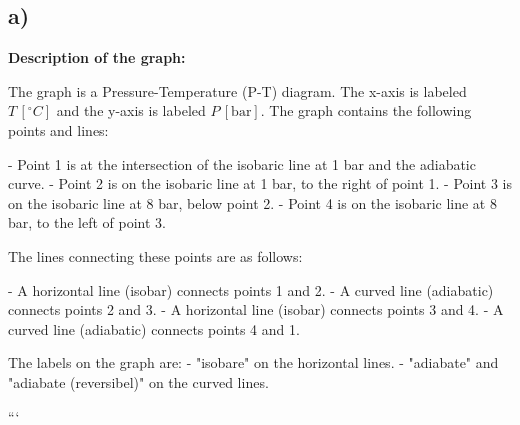 

\subsection*{a)}

\textbf{Description of the graph:}

The graph is a Pressure-Temperature (P-T) diagram. The x-axis is labeled \( T \, [^\circ C] \) and the y-axis is labeled \( P \, [\text{bar}] \). The graph contains the following points and lines:

- Point 1 is at the intersection of the isobaric line at 1 bar and the adiabatic curve.
- Point 2 is on the isobaric line at 1 bar, to the right of point 1.
- Point 3 is on the isobaric line at 8 bar, below point 2.
- Point 4 is on the isobaric line at 8 bar, to the left of point 3.

The lines connecting these points are as follows:

- A horizontal line (isobar) connects points 1 and 2.
- A curved line (adiabatic) connects points 2 and 3.
- A horizontal line (isobar) connects points 3 and 4.
- A curved line (adiabatic) connects points 4 and 1.

The labels on the graph are:
- "isobare" on the horizontal lines.
- "adiabate" and "adiabate (reversibel)" on the curved lines.

```